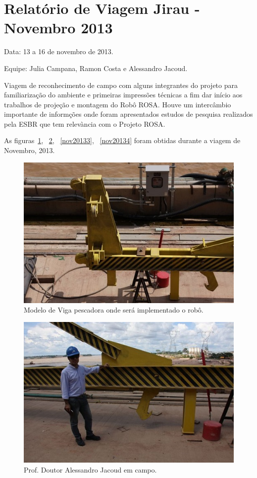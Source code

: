 \section{Relatório de Viagem Jirau - Novembro 2013}\label{sec::nov2013}
Data: 13 a 16 de novembro de 2013.

Equipe: Julia Campana, Ramon Costa e Alessandro Jacoud.


Viagem de reconhecimento de campo com alguns integrantes do projeto para
familiarização do ambiente e primeiras impressões técnicas a fim dar início aos
trabalhos de projeção e montagem do Robô ROSA. Houve um intercâmbio importante
de informções onde foram apresentados estudos de pesquisa realizados pela ESBR
que tem relevància com o Projeto ROSA.

As figuras~\ref{nov20131}, ~\ref{nov20132}, ~\ref{nov20133}, ~\ref{nov20134}
foram obtidas durante a viagem de Novembro, 2013.



\begin{figure}[h!]
\centering
  \includegraphics[width=1\linewidth]{Fotos/Novembro2013/1.jpg}
  \caption{Modelo de Viga pescadora onde será implementado o robô.}
  \label{nov20131}
\end{figure}

\begin{figure}[h!]
  \centering
  \includegraphics[width=1\linewidth]{Fotos/Novembro2013/2.jpg}
  \caption{Prof. Doutor Alessandro Jacoud em campo.}
  \label{nov20132}
\end{figure}

